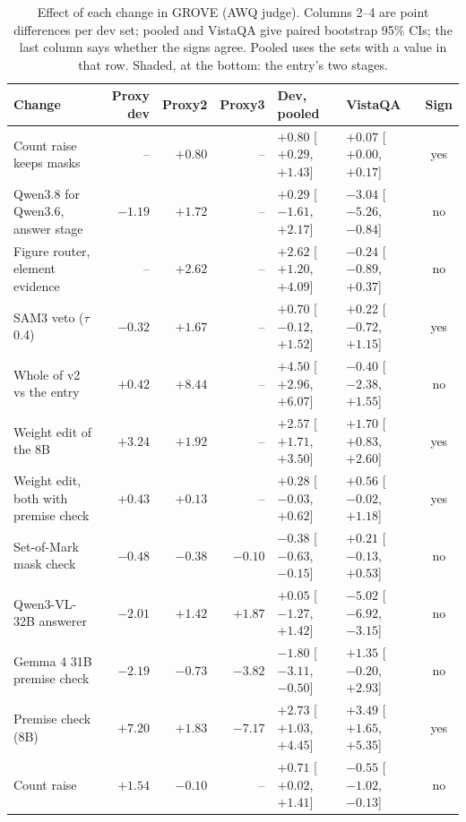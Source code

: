 \documentclass{article}
\newcommand{\ours}{\rowcolor{oursbg}}
\begin{document}
\begin{table}[!htbp]
\centering\scriptsize
\setlength{\tabcolsep}{3pt}
\caption{Effect of each change in GROVE (AWQ judge). Columns 2--4 are point differences per dev set; pooled and VistaQA give paired
bootstrap 95\% CIs; the last column says whether the signs agree. Pooled uses the sets with a value in that row. Shaded, at the
bottom: the entry's two stages.}
\label{tab:transfer}
\begin{tabular}{lrrrllc}
\toprule
Change & Proxy dev & Proxy2 & Proxy3 & Dev, pooled & VistaQA & Sign \\
\midrule
Count raise keeps masks & -- & $+0.80$ & -- & $+0.80$ [$+0.29$, $+1.43$] & $+0.07$ [$+0.00$, $+0.17$] & yes \\
Qwen3.8 for Qwen3.6, answer stage & $-1.19$ & $+1.72$ & -- & $+0.29$ [$-1.61$, $+2.17$] & $-3.04$ [$-5.26$, $-0.84$] & no \\
Figure router, element evidence & -- & $+2.62$ & -- & $+2.62$ [$+1.20$, $+4.09$] & $-0.24$ [$-0.89$, $+0.37$] & no \\
SAM3 veto ($\tau$ 0.4) & $-0.32$ & $+1.67$ & -- & $+0.70$ [$-0.12$, $+1.52$] & $+0.22$ [$-0.72$, $+1.15$] & yes \\
Whole of v2 vs the entry & $+0.42$ & $+8.44$ & -- & $+4.50$ [$+2.96$, $+6.07$] & $-0.40$ [$-2.38$, $+1.55$] & no \\
Weight edit of the 8B & $+3.24$ & $+1.92$ & -- & $+2.57$ [$+1.71$, $+3.50$] & $+1.70$ [$+0.83$, $+2.60$] & yes \\
Weight edit, both with premise check & $+0.43$ & $+0.13$ & -- & $+0.28$ [$-0.03$, $+0.62$] & $+0.56$ [$-0.02$, $+1.18$] & yes \\
Set-of-Mark mask check & $-0.48$ & $-0.38$ & $-0.10$ & $-0.38$ [$-0.63$, $-0.15$] & $+0.21$ [$-0.13$, $+0.53$] & no \\
Qwen3-VL-32B answerer & $-2.01$ & $+1.42$ & $+1.87$ & $+0.05$ [$-1.27$, $+1.42$] & $-5.02$ [$-6.92$, $-3.15$] & no \\
Gemma 4 31B premise check & $-2.19$ & $-0.73$ & $-3.82$ & $-1.80$ [$-3.11$, $-0.50$] & $+1.35$ [$-0.20$, $+2.93$] & no \\
\midrule
\ours Premise check (8B) & $+7.20$ & $+1.83$ & $-7.17$ & $+2.73$ [$+1.03$, $+4.45$] & $+3.49$ [$+1.65$, $+5.35$] & yes \\
\ours Count raise & $+1.54$ & $-0.10$ & -- & $+0.71$ [$+0.02$, $+1.41$] & $-0.55$ [$-1.02$, $-0.13$] & no \\
\bottomrule
\end{tabular}
\end{table}
\end{document}
